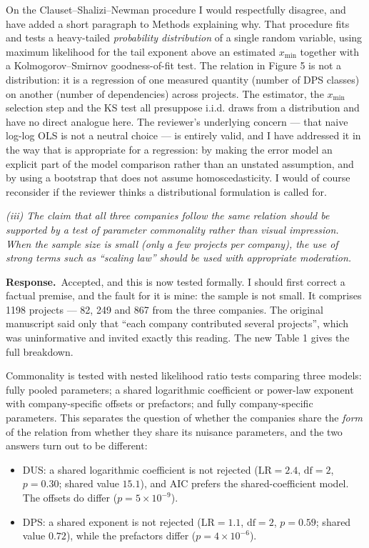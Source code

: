 \documentclass[11pt,a4paper]{article}
\newcommand{\rev}[1]{\medskip\noindent\textit{#1}\par\medskip}
\newcommand{\reply}{\noindent\textbf{Response.}\ }
\begin{document}
On the Clauset--Shalizi--Newman procedure I would respectfully disagree, and
have added a short paragraph to Methods explaining why. That procedure fits and
tests a heavy-tailed \emph{probability distribution} of a single random
variable, using maximum likelihood for the tail exponent above an estimated
$x_{\min}$ together with a Kolmogorov--Smirnov goodness-of-fit test. The
relation in Figure 5 is not a distribution: it is a regression of one measured
quantity (number of DPS classes) on another (number of dependencies) across
projects. The estimator, the $x_{\min}$ selection step and the KS test all
presuppose i.i.d. draws from a distribution and have no direct analogue here.
The reviewer's underlying concern --- that naive log-log OLS is not a neutral
choice --- is entirely valid, and I have addressed it in the way that is
appropriate for a regression: by making the error model an explicit part of the
model comparison rather than an unstated assumption, and by using a bootstrap
that does not assume homoscedasticity. I would of course reconsider if the
reviewer thinks a distributional formulation is called for.

\rev{(iii) The claim that all three companies follow the same relation should be
supported by a test of parameter commonality rather than visual impression. When
the sample size is small (only a few projects per company), the use of strong
terms such as ``scaling law'' should be used with appropriate moderation.}

\reply Accepted, and this is now tested formally. I should first correct a
factual premise, and the fault for it is mine: the sample is not small. It
comprises 1198 projects --- 82, 249 and 867 from the three companies. The
original manuscript said only that ``each company contributed several
projects'', which was uninformative and invited exactly this reading. The new
Table 1 gives the full breakdown.

Commonality is tested with nested likelihood ratio tests comparing three models:
fully pooled parameters; a shared logarithmic coefficient or power-law exponent
with company-specific offsets or prefactors; and fully company-specific
parameters. This separates the question of whether the companies share the
\emph{form} of the relation from whether they share its nuisance parameters, and
the two answers turn out to be different:

\begin{itemize}
\item DUS: a shared logarithmic coefficient is not rejected
($\mathrm{LR} = 2.4$, $\mathrm{df} = 2$, $p = 0.30$; shared value $15.1$), and
AIC prefers the shared-coefficient model. The offsets do differ
($p = 5 \times 10^{-9}$).
\item DPS: a shared exponent is not rejected ($\mathrm{LR} = 1.1$,
$\mathrm{df} = 2$, $p = 0.59$; shared value $0.72$), while the prefactors differ
($p = 4 \times 10^{-6}$).
\end{itemize}
\end{document}
